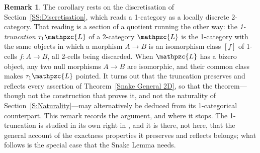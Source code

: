 \documentclass[reqno,a4paper]{amsart}
\numberwithin{equation}{section}
\theoremstyle{plain}
\theoremstyle{definition}
\newtheorem{remark}[subsection]{Remark}
\def\nameit#1{\textrm{#1}~}
\def\thex{\nameit{Theorem}}
\def\dfn#1{{\itshape #1}}
\newcommand{\catfont}[1]{\ensuremath{\mathpzc{#1}}\xspace}
\def\L{\catfont{L}}
\renewcommand{\1}{\onecat{1}}
\newcommand{\trunc}{\ensuremath{\tau_{1}}}
\begin{document}
\begin{remark}\label{Rem Truncation}
	The corollary rests on the discretisation of Section~\ref{SS:Discretisation}, which reads a 1-category as a locally discrete 2-category. That reading is a section of a quotient running the other way: the \dfn{1-truncation} \(\trunc\L\) of a 2-category \(\L\) is the 1-category with the same objects in which a morphism \(A\to B\) is an isomorphism class \([f]\) of 1-cells \(f\colon A\to B\), all 2-cells being discarded. When \(\L\) has a bizero object, any two null morphisms \(A\to B\) are isomorphic, and their common class makes \(\trunc\L\) pointed. It turns out that the truncation preserves and reflects every assertion of \thex\ref{Snake General 2D}, so that the theorem---though not the construction that proves it, and not the naturality of Section~\ref{S:Naturality}---may alternatively be deduced from its 1-categorical counterpart. This remark records the argument, and where it stops. The 1-truncation is studied in its own right in \cite{CavJanMesRei26}, and it is there, not here, that the general account of the exactness properties it preserves and reflects belongs; what follows is the special case that the Snake Lemma needs.


\end{remark}
\end{document}
